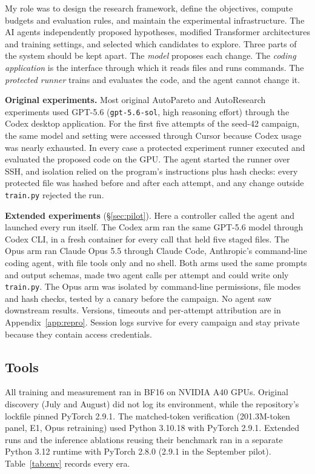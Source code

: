 \documentclass{article}
\newif\ifshowhumanmarkers \showhumanmarkersfalse
\newcommand{\humantag}[1]{{\color{humanframe}\sffamily\scriptsize\bfseries HUMAN AUTHOR MUST REWRITE/VERIFY [#1]}\ }
\newcommand{\humanauthor}[2][]{\ifshowhumanmarkers\begin{humanbox}\humantag{#1}#2\end{humanbox}\else #2\par\fi}
\begin{document}
\humanauthor[P2-02 r6]{ My role was to design the research framework, define the objectives, compute budgets and evaluation rules, and maintain the experimental infrastructure. The AI agents independently proposed hypotheses, modified Transformer architectures and training settings, and selected which candidates to explore. Three parts of the system should be kept apart. The \emph{model} proposes each change. The \emph{coding application} is the interface through which it reads files and runs commands. The \emph{protected runner} trains and evaluates the code, and the agent cannot change it.

\looseness=-1 \textbf{Original experiments.} Most original AutoPareto and AutoResearch experiments used GPT-5.6 (\texttt{gpt-5.6-sol}, high reasoning effort) through the Codex desktop application. For the first five attempts of the seed-42 campaign, the same model and setting were accessed through Cursor because Codex usage was nearly exhausted. In every case a protected experiment runner executed and evaluated the proposed code on the GPU. The agent started the runner over SSH, and isolation relied on the program's instructions plus hash checks: every protected file was hashed before and after each attempt, and any change outside \texttt{train.py} rejected the run.

\looseness=-1 \textbf{Extended experiments} (\S\ref{sec:pilot}). Here a controller called the agent and launched every run itself. The Codex arm ran the same GPT-5.6 model through Codex CLI, in a fresh container for every call that held five staged files. The Opus arm ran Claude Opus 5.5 through Claude Code, Anthropic's command-line coding agent, with file tools only and no shell. Both arms used the same prompts and output schemas, made two agent calls per attempt and could write only \texttt{train.py}. The Opus arm was isolated by command-line permissions, file modes and hash checks, tested by a canary before the campaign. No agent saw downstream results. Versions, timeouts and per-attempt attribution are in Appendix~\ref{app:repro}. Session logs survive for every campaign and stay private because they contain access credentials.}

\subsection{Tools}
\humanauthor[P2-03 r6]{ All training and measurement ran in BF16 on NVIDIA A40 GPUs. Original discovery (July and August) did not log its environment, while the repository's lockfile pinned PyTorch 2.9.1. The matched-token verification (201.3M-token panel, E1, Opus retraining) used Python 3.10.18 with PyTorch 2.9.1. Extended runs and the inference ablations reusing their benchmark ran in a separate Python 3.12 runtime with PyTorch 2.8.0 (2.9.1 in the September pilot). Table~\ref{tab:env} records every era.}
\end{document}
